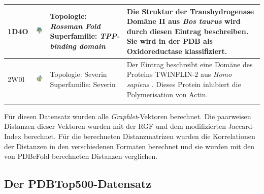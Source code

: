 \documentclass{report}
\begin{document}
\begin{table}
\begin{center}
\begin{tabular}{ | C{9mm} | C{30mm} | C{29mm} | C{38mm} | }
1D4O  & \includegraphics[width=30mm, trim= -10 -5 -5 -10]{1D4O_bio_r_500.jpg}  & Topologie: \newline \textit{Rossman Fold} \newline Superfamilie: \newline \textit{TPP-binding domain} & Die Struktur der Transhydrogenase Dom\"ane II aus \textit{Bos taurus} \cite{1d4o} wird durch diesen Eintrag beschreiben. Sie wird in der PDB als Oxidoreductase klassifiziert. \\ \hline
2W0I  & \includegraphics[width=30mm, trim= -10 -5 -5 -10]{2W0I_bio_r_500.jpg} & Topologie: \newline Severin \newline Superfamilie: \newline Severin & Der Eintrag beschreibt eine Dom\"ane des Proteins TWINFLIN-2 aus \textit{Homo sapiens} \cite{2woi}. Dieses Protein inhibiert die Polymerisation von Actin. \\ 
\hline

\label{tab:occ_ab}
\end{tabular}
\end{center}

\end{table}

F\"ur diesen Datensatz wurden alle \textit{Graphlet}-Vektoren berechnet. Die paarweisen Distanzen dieser Vektoren wurden mit der RGF und dem modifizierten Jaccard-Index berechnet. F\"ur die berechneten Distanzmatrizen wurden die Korrelationen der Distanzen in den verschiedenen Formaten berechnet und sie wurden mit den von PDBeFold berechneten Distanzen verglichen. 



\subsection{Der PDBTop500-Datensatz}
\end{document}
